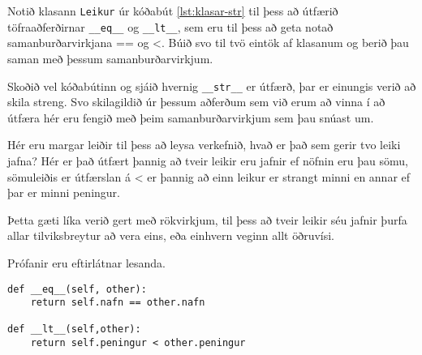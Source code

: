 \begin{exercise}\label{kla2}
Notið klasann \texttt{Leikur} úr kóðabút \ref{lst:klasar-str} til þess að útfærið töfraaðferðirnar \texttt{\_\_eq\_\_} og \texttt{\_\_lt\_\_}, sem eru til þess að geta notað samanburðarvirkjana == og <.
Búið svo til tvö eintök af klasanum og berið þau saman með þessum samanburðarvirkjum.

Skoðið vel kóðabútinn og sjáið hvernig \texttt{\_\_str\_\_} er útfærð, þar er einungis verið að skila streng.
Svo skilagildið úr þessum aðferðum sem við erum að vinna í að útfæra hér eru fengið með þeim samanburðarvirkjum sem þau snúast um.
\end{exercise}
\begin{Answer}[ref={kla2}]
	Hér eru margar leiðir til þess að leysa verkefnið, hvað er það sem gerir tvo leiki jafna?
	Hér er það útfært þannig að tveir leikir eru jafnir ef nöfnin eru þau sömu, sömuleiðis er útfærslan á < er þannig að einn leikur er strangt minni en annar ef þar er minni peningur.
	
	Þetta gæti líka verið gert með rökvirkjum, til þess að tveir leikir séu jafnir þurfa allar tilviksbreytur að vera eins, eða einhvern veginn allt öðruvísi.
	
	Prófanir eru eftirlátnar lesanda.
	\begin{lstlisting}
def __eq__(self, other):
	return self.nafn == other.nafn

def __lt__(self,other):
	return self.peningur < other.peningur\end{lstlisting}
\end{Answer}